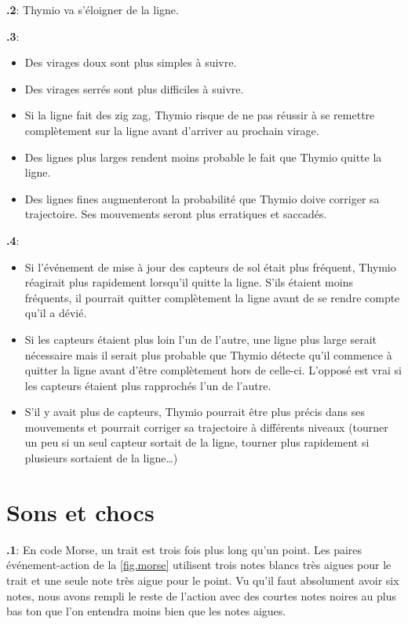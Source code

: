 \documentclass[12pt,a4paper,french]{article}
\begin{document}
\textbf{\thesection.2}: Thymio va s'éloigner de la ligne.

\textbf{\thesection.3}:
\begin{itemize}
\item Des virages doux sont plus simples à suivre. 
\item Des virages serrés sont plus difficiles à suivre.
\item Si la ligne fait des zig zag, Thymio risque de ne pas réussir à se remettre complètement sur la ligne avant d'arriver au prochain virage.
\item Des lignes plus larges rendent moins probable le fait que Thymio quitte la ligne.
\item Des lignes fines augmenteront la probabilité que Thymio doive corriger sa trajectoire. Ses mouvements seront plus erratiques et saccadés.
\end{itemize}


\textbf{\thesection.4}:
\begin{itemize}
\item Si l'événement de mise à jour des capteurs de sol était plus fréquent, Thymio réagirait plus rapidement lorsqu'il quitte la ligne. S'ils étaient moins fréquents, il pourrait quitter complètement la ligne avant de se rendre compte qu'il a dévié.
\item Si les capteurs étaient plus loin l'un de l'autre, une ligne plus large serait nécessaire mais il serait plus probable que Thymio détecte qu'il commence à quitter la ligne avant d'être complètement hors de celle-ci. L'opposé est vrai si les capteurs étaient plus rapprochés l'un de l'autre.
\item S'il y avait plus de capteurs, Thymio pourrait être plus précis dans ses mouvements et pourrait corriger sa trajectoire à différents niveaux (tourner un peu si un seul capteur sortait de la ligne, tourner plus rapidement si plusieurs sortaient de la ligne\ldots)
\end{itemize}

\section{Sons et chocs}

\textbf{\thesection.1}:
En code Morse, un trait est trois fois plus long qu'un point. Les paires événement-action de la \cref{fig.morse} utilisent trois notes blancs très aigues pour le trait et une seule note très aigue pour le point. Vu qu'il faut absolument avoir six notes, nous avons rempli le reste de l'action avec des courtes notes noires au plus bas ton que l'on entendra moins bien que les notes aigues.
\end{document}
